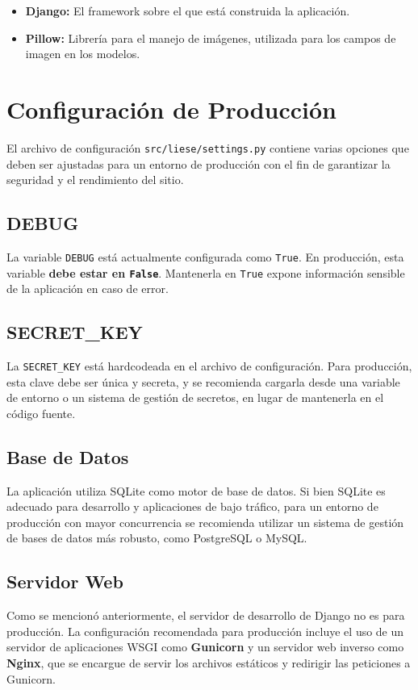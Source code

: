 \begin{itemize}
    \item \textbf{Django:} El framework sobre el que está construida la aplicación.
    \item \textbf{Pillow:} Librería para el manejo de imágenes, utilizada para los campos de imagen en los modelos.
\end{itemize}

\section{Configuración de Producción}

El archivo de configuración \texttt{src/liese/settings.py} contiene varias opciones que deben ser ajustadas para un entorno de producción con el fin de garantizar la seguridad y el rendimiento del sitio.

\subsection{DEBUG}
La variable \texttt{DEBUG} está actualmente configurada como \texttt{True}. En producción, esta variable \textbf{debe estar en \texttt{False}}. Mantenerla en \texttt{True} expone información sensible de la aplicación en caso de error.

\subsection{SECRET\_KEY}
La \texttt{SECRET\_KEY} está hardcodeada en el archivo de configuración. Para producción, esta clave debe ser única y secreta, y se recomienda cargarla desde una variable de entorno o un sistema de gestión de secretos, en lugar de mantenerla en el código fuente.

\subsection{Base de Datos}
La aplicación utiliza SQLite como motor de base de datos. Si bien SQLite es adecuado para desarrollo y aplicaciones de bajo tráfico, para un entorno de producción con mayor concurrencia se recomienda utilizar un sistema de gestión de bases de datos más robusto, como PostgreSQL o MySQL.

\subsection{Servidor Web}
Como se mencionó anteriormente, el servidor de desarrollo de Django no es para producción. La configuración recomendada para producción incluye el uso de un servidor de aplicaciones WSGI como \textbf{Gunicorn} y un servidor web inverso como \textbf{Nginx}, que se encargue de servir los archivos estáticos y redirigir las peticiones a Gunicorn.